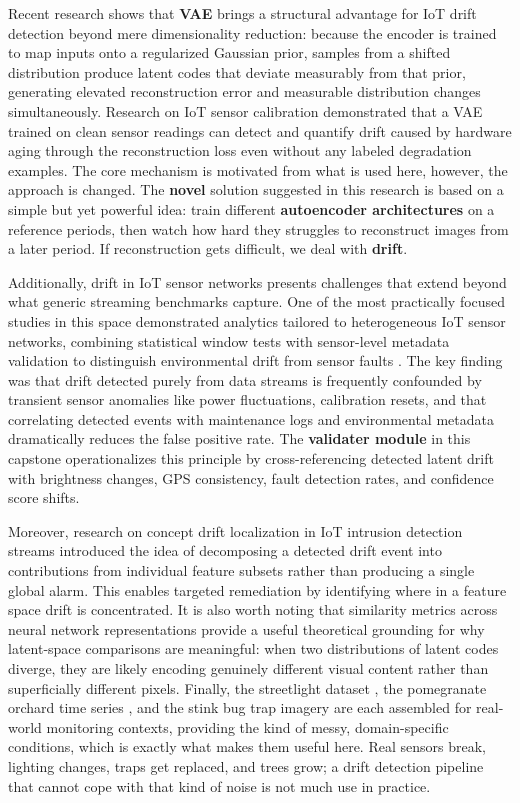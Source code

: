 \documentclass[journal]{IEEEtran} %
\begin{document}
Recent research shows that \textbf{VAE} brings a structural advantage for IoT drift detection beyond mere dimensionality reduction\cite{six}: because the encoder is trained to map inputs onto a regularized Gaussian prior, samples from a shifted distribution produce latent codes that deviate measurably from that prior, generating elevated reconstruction error and measurable distribution changes simultaneously. Research on IoT sensor calibration demonstrated that a VAE trained on clean sensor readings can detect and quantify drift caused by hardware aging through the reconstruction loss even without any labeled degradation examples\cite{six}. The core mechanism is motivated from what is used here, however, the approach is changed. The \textbf{novel} solution suggested in this research is based on a simple but yet powerful idea: train different \textbf{autoencoder architectures} on a reference periods, then watch how hard they struggles to reconstruct images from a later period. If reconstruction gets difficult, we deal with \textbf{drift}.

Additionally, drift in IoT sensor networks presents challenges that extend beyond what generic streaming benchmarks capture. One of the most practically focused studies in this space demonstrated analytics tailored to heterogeneous IoT sensor networks, combining statistical window tests with sensor-level metadata validation to distinguish environmental drift from sensor faults \cite{five}. The key finding was that drift detected purely from data streams is frequently confounded by transient sensor anomalies like power fluctuations, calibration resets, and that correlating detected events with maintenance logs and environmental metadata dramatically reduces the false positive rate. The \textbf{validater module} in this capstone operationalizes this principle by cross-referencing detected latent drift with brightness changes, GPS consistency, fault detection rates, and confidence score shifts.

Moreover, research on concept drift localization in IoT intrusion detection streams \cite{seven} introduced the idea of decomposing a detected drift event into contributions from individual feature subsets rather than producing a single global alarm. This enables targeted remediation by identifying where in a feature space drift is concentrated. It is also worth noting that similarity metrics across neural network representations \cite{thirteen} provide a useful theoretical grounding for why latent-space comparisons are meaningful: when two distributions of latent codes diverge, they are likely encoding genuinely different visual content rather than superficially different pixels. Finally, the streetlight dataset \cite{eleven}, the pomegranate orchard time series \cite{fourteen}, and the stink bug trap imagery\cite{fifteen} are each assembled for real-world monitoring contexts, providing the kind of messy, domain-specific conditions, which is exactly what makes them useful here. Real sensors break, lighting changes, traps get replaced, and trees grow; a drift detection pipeline that cannot cope with that kind of noise is not much use in practice\cite{one, two}.
\end{document}
